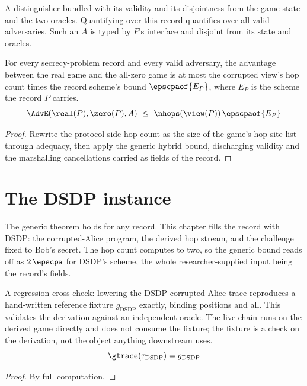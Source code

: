 \begin{definition}
  \label{def:adversary}
  \rocqok
  A distinguisher bundled with its validity and its disjointness from the game
  state and the two oracles. Quantifying over this record quantifies over all
  valid adversaries. Such an $A$ is typed by $P$'s interface and disjoint from its
  state and oracles.
\end{definition}

\begin{theorem}
  \label{thm:generic_secrecy}
  \rocqok
  For every secrecy-problem record and every valid adversary, the advantage
  between the real game and the all-zero game is at most the corrupted view's hop
  count times the record scheme's bound $\epscpaof{E_P}$, where $E_P$ is the
  scheme the record $P$ carries.
  \[ \AdvE(\real(P), \zero(P), A) \ \le\ \nhops(\view(P))\,\epscpaof{E_P} \]
\end{theorem}
\begin{proof}
  \rocqok
  Rewrite the protocol-side hop count as the size of the game's hop-site list
  through adequacy, then apply the generic hybrid bound, discharging validity and
  the marshalling cancellations carried as fields of the record.
\end{proof}

\chapter{The DSDP instance}

The generic theorem holds for any record. This chapter fills the record with
DSDP: the corrupted-Alice program, the derived hop stream, and the challenge
fixed to Bob's secret. The hop count computes to two, so the generic bound reads
off as $2\,\epscpa$ for DSDP's scheme, the whole researcher-supplied input being
the record's fields.

\begin{lemma}
  \label{lem:dsdp_faithful}
  \rocqok
  A regression cross-check: lowering the DSDP corrupted-Alice trace reproduces a
  hand-written reference fixture $g_{\mathrm{DSDP}}$ exactly, binding positions
  and all. This validates the derivation against an independent oracle. The live
  chain runs on the derived game directly and does not consume the fixture; the
  fixture is a check on the derivation, not the object anything downstream uses.
  \[ \gtrace(\tau_{\mathrm{DSDP}}) = g_{\mathrm{DSDP}} \]
\end{lemma}
\begin{proof}
  \rocqok
  By full computation.
\end{proof}

